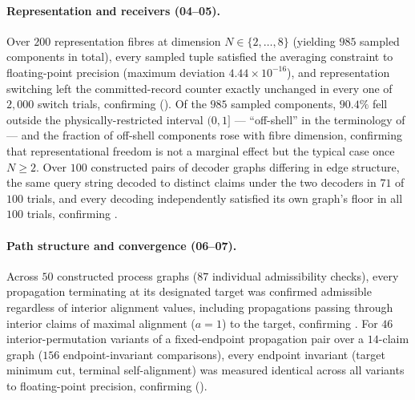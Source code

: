 \documentclass[11pt,twocolumn,a4paper]{article}
\theoremstyle{thmstyle}
\theoremstyle{definition}
\theoremstyle{remark}
\begin{document}
\paragraph{Representation and receivers (04--05).}
Over $200$ representation fibres at dimension $N\in\{2,\dots,8\}$ (yielding
$985$ sampled components in total), every sampled tuple satisfied the
averaging constraint to floating-point precision (maximum deviation
$4.44\times10^{-16}$), and representation switching left the
committed-record counter exactly unchanged in every one of $2{,}000$
switch trials, confirming 
(). Of the $985$ sampled components,
$90.4\%$ fell outside the physically-restricted interval $(0,1]$ ---
``off-shell'' in the terminology of  --- and the
fraction of off-shell components rose with fibre dimension, confirming
that representational freedom is not a marginal effect but the typical
case once $N\ge2$. Over $100$ constructed pairs of decoder graphs
differing in edge structure, the same query string decoded to distinct
claims under the two decoders in $71$ of $100$ trials, and every decoding
independently satisfied its own graph's floor in all $100$ trials,
confirming .

\paragraph{Path structure and convergence (06--07).}
Across $50$ constructed process graphs ($87$ individual admissibility
checks), every propagation terminating at its designated target was
confirmed admissible regardless of interior alignment values, including
propagations passing through interior claims of maximal alignment
($a=1$) to the target, confirming . For $46$
interior-permutation variants of a fixed-endpoint propagation pair over a
$14$-claim graph ($156$ endpoint-invariant comparisons), every endpoint
invariant (target minimum cut, terminal self-alignment) was measured
identical across all variants to floating-point precision, confirming
 ().
\end{document}
